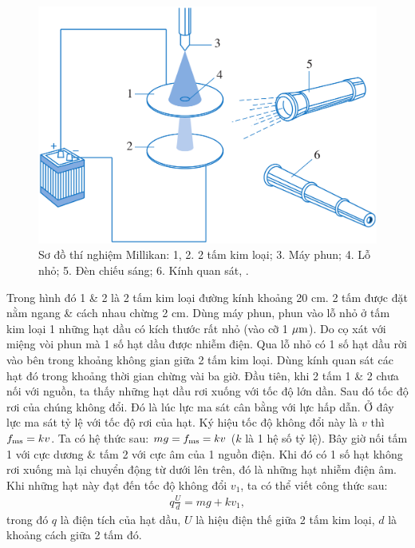 \documentclass[oneside]{book}
\numberwithin{equation}{section}
\begin{document}
\begin{figure}[H]
	\centering
	\includegraphics[scale=0.15]{so_do_thi_nghiem_Millikan}
	\caption{Sơ đồ thí nghiệm Millikan: 1, 2. 2 tấm kim loại; 3. Máy phun; 4. Lỗ nhỏ; 5. Đèn chiếu sáng; 6. Kính quan sát, \cite[Hình 4.6, p. 24]{SGK_Vat_Ly_11_nang_cao}.}
	\label{fig:so do thi nghiem Millikan}
\end{figure}
Trong hình đó 1 \& 2 là 2 tấm kim loại đường kính khoảng 20 cm. 2 tấm được đặt nằm ngang \& cách nhau chừng 2 cm. Dùng máy phun, phun vào lỗ nhỏ ở tấm kim loại 1 những hạt dầu có kích thước rất nhỏ (vào cỡ 1 $\rm\mu m$). Do cọ xát với miệng vòi phun mà 1 số hạt dầu được nhiễm điện. Qua lỗ nhỏ có 1 số hạt dầu rời vào bên trong khoảng không gian giữa 2 tấm kim loại. Dùng kính quan sát các hạt đó trong khoảng thời gian chừng vài ba giờ. Đầu tiên, khi 2 tấm 1 \& 2 chưa nối với nguồn, ta thấy những hạt dầu rơi xuống với tốc độ lớn dần. Sau đó tốc độ rơi của chúng không đổi. Đó là lúc lực ma sát cân bằng với lực hấp dẫn. Ở đây lực ma sát tỷ lệ với tốc độ rơi của hạt. Ký hiệu tốc độ không đổi này là $v$ thì $f_{\rm ms} = kv$. Ta có hệ thức sau: $mg = f_{\rm ms} = kv$  ($k$ là 1 hệ số tỷ lệ). Bây giờ nối tấm 1 với cực dương \& tấm 2 với cực âm của 1 nguồn điện. Khi đó có 1 số hạt không rơi xuống mà lại chuyển động từ dưới lên trên, đó là những hạt nhiễm điện âm. Khi những hạt này đạt đến tốc độ không đổi $v_1$, ta có thể viết công thức sau:
\begin{align}
	\label{SGK Vat ly 11 (1) p. 24}
	q\frac{U}{d} = mg + kv_1,
\end{align}
trong đó $q$ là điện tích của hạt dầu, $U$ là hiệu điện thế giữa 2 tấm kim loại, $d$ là khoảng cách giữa 2 tấm đó.
\end{document}
